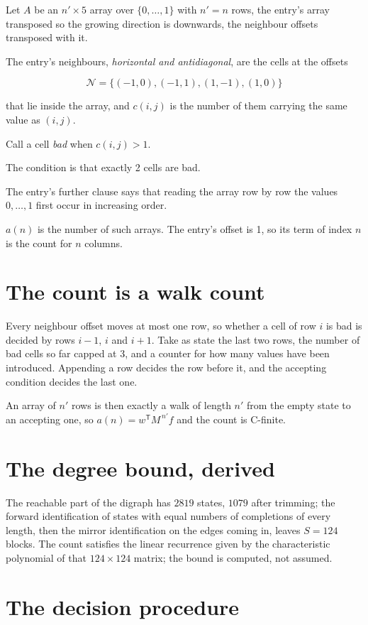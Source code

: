 \documentclass[11pt]{article}
\theoremstyle{definition}
\begin{document}
Let $A$ be an $n' \times 5$ array over $\{0,\dots,1\}$ with $n' = n$ rows, the entry's array transposed so the growing direction is downwards, the neighbour offsets transposed with it.

The entry's neighbours, {\itshape horizontal and antidiagonal}, are the cells at the offsets

\[\mathcal{N} = \{(-1,0), (-1,1), (1,-1), (1,0)\}\]

that lie inside the array, and $c(i,j)$ is the number of them carrying the same value as $(i,j)$.

Call a cell {\itshape bad} when $c(i,j) > 1$.

The condition is that exactly 2 cells are bad.

The entry's further clause says that reading the array row by row the values $0,\dots,1$ first occur in increasing order.

$a(n)$ is the number of such arrays. The entry's offset is 1, so its term of index $n$ is the count for $n$ columns.

\section{The count is a walk count}

Every neighbour offset moves at most one row, so whether a cell of row $i$ is bad is decided by rows $i-1$, $i$ and $i+1$. Take as state the last two rows, the number of bad cells so far capped at 3, and a counter for how many values have been introduced. Appending a row decides the row before it, and the accepting condition decides the last one.

An array of $n'$ rows is then exactly a walk of length $n'$ from the empty state to an accepting one, so $a(n) = w^{\mathsf T}M^{\,n'}f$ and the count is C-finite.

\section{The degree bound, derived}

The reachable part of the digraph has $2819$ states, $1079$ after trimming; the forward identification of states with equal numbers of completions of every length, then the mirror identification on the edges coming in, leaves $S = 124$ blocks. The count satisfies the linear recurrence given by the characteristic polynomial of that $124\times124$ matrix; the bound is computed, not assumed.

\section{The decision procedure}
\end{document}
